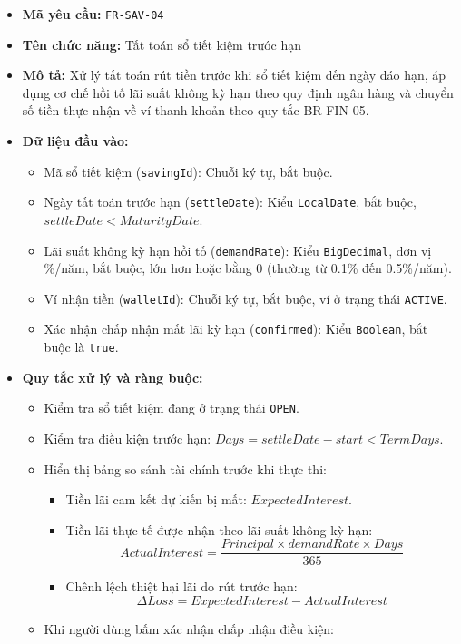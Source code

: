 \documentclass[11pt,a4paper]{article}
\providecommand{\tightlist}{
  \setlength{\itemsep}{0pt}\setlength{\parskip}{0pt}}
\begin{document}
\begin{itemize}
\tightlist
\item
  \textbf{Mã yêu cầu:} \texttt{FR-SAV-04}
\item
  \textbf{Tên chức năng:} Tất toán sổ tiết kiệm trước hạn
\item
  \textbf{Mô tả:} Xử lý tất toán rút tiền trước khi sổ tiết kiệm đến
  ngày đáo hạn, áp dụng cơ chế hồi tố lãi suất không kỳ hạn theo quy
  định ngân hàng và chuyển số tiền thực nhận về ví thanh khoản theo quy
  tắc BR-FIN-05.
\item
  \textbf{Dữ liệu đầu vào:}

  \begin{itemize}
  \tightlist
  \item
    Mã sổ tiết kiệm (\texttt{savingId}): Chuỗi ký tự, bắt buộc.
  \item
    Ngày tất toán trước hạn (\texttt{settleDate}): Kiểu
    \texttt{LocalDate}, bắt buộc, \(settleDate < MaturityDate\).
  \item
    Lãi suất không kỳ hạn hồi tố (\texttt{demandRate}): Kiểu
    \texttt{BigDecimal}, đơn vị \%/năm, bắt buộc, lớn hơn hoặc bằng 0
    (thường từ 0.1\% đến 0.5\%/năm).
  \item
    Ví nhận tiền (\texttt{walletId}): Chuỗi ký tự, bắt buộc, ví ở trạng
    thái \texttt{ACTIVE}.
  \item
    Xác nhận chấp nhận mất lãi kỳ hạn (\texttt{confirmed}): Kiểu
    \texttt{Boolean}, bắt buộc là \texttt{true}.
  \end{itemize}
\item
  \textbf{Quy tắc xử lý và ràng buộc:}

  \begin{itemize}
  \tightlist
  \item
    Kiểm tra sổ tiết kiệm đang ở trạng thái \texttt{OPEN}.
  \item
    Kiểm tra điều kiện trước hạn:
    \(Days = settleDate - start < TermDays\).
  \item
    Hiển thị bảng so sánh tài chính trước khi thực thi:

    \begin{itemize}
    \tightlist
    \item
      Tiền lãi cam kết dự kiến bị mất: \(ExpectedInterest\).
    \item
      Tiền lãi thực tế được nhận theo lãi suất không kỳ hạn:
      \[ActualInterest = \frac{Principal \times demandRate \times Days}{365}\]
    \item
      Chênh lệch thiệt hại lãi do rút trước hạn:
      \[
      \Delta Loss = ExpectedInterest - ActualInterest
      \]
    \end{itemize}
  \item
    Khi người dùng bấm xác nhận chấp nhận điều kiện:


\end{itemize}
\end{itemize}
\end{document}
